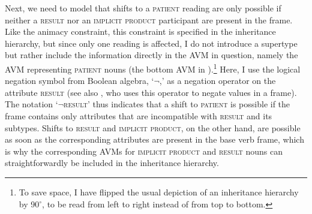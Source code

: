 Next, we need to model that shifts to a \textsc{patient} reading are only possible if neither a \textsc{result} nor an \textsc{implicit product} participant are present in the frame. Like the animacy constraint, this constraint is specified in the inheritance hierarchy, but since only one reading is affected, I do not introduce a supertype but rather include the information directly in the AVM in question, namely the AVM representing \textsc{patient} nouns (the bottom AVM in ).\footnote{To save space, I have flipped the usual depiction of an inheritance hierarchy by 90$^{\circ}$, to be read from left to right instead of from top to bottom.} 
Here, I use the logical negation symbol from Boolean algebra, `$\neg$,' as a negation operator on the attribute \textsc{result} (see also \citealt{Andreou.2017}, who uses this operator to negate values in a frame). The notation `$\neg$\textsc{result}' thus indicates that a shift to \textsc{patient} is possible if the frame contains only attributes that are incompatible with \textsc{result} and its subtypes. 
Shifts to \textsc{result} and \textsc{implicit product}, on the other hand, are possible as soon as the corresponding attributes are present in the base verb frame, which is why the corresponding AVMs for \textsc{implicit product} and \textsc{result} nouns can straightforwardly be included in the inheritance hierarchy. 

